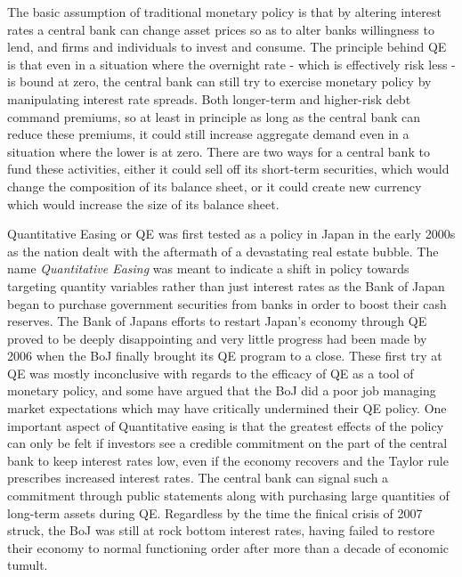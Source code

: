 \documentclass[12pt]{report}
\begin{document}

The basic assumption of traditional monetary policy is that by altering interest rates a central bank can change asset prices so as to alter banks willingness to lend, and firms and individuals to invest and consume.\autocite[51]{fawley2013four}
The principle behind QE is that even in a situation where the overnight rate - which is effectively risk less - is bound at zero, the central bank can still try to exercise monetary policy by manipulating interest rate spreads.\autocite[466]{blinder2010quantitative}
Both longer-term and higher-risk debt command premiums, so at least in principle as long as the central bank can reduce these premiums, it could still increase aggregate demand even in a situation where the lower is at zero.\autocite[466]{blinder2010quantitative}
There are two ways for a central bank to fund these activities, either it could sell off its short-term securities, which would change the composition of its balance sheet, or it could create new currency which would increase the size of its balance sheet.\autocite[467]{blinder2010quantitative}

Quantitative Easing or QE was first tested as a policy in Japan in the early 2000s as the nation dealt with the aftermath of a devastating real estate bubble.\autocite[274]{joyce2012quantitative}
The name \emph{Quantitative Easing} was meant to indicate a shift in policy towards targeting quantity variables rather than just interest rates as the Bank of Japan began to purchase government securities from banks in order to boost their cash reserves.\autocite[274]{joyce2012quantitative}
The Bank of Japans efforts to restart Japan's economy through QE proved to be deeply disappointing and very little progress had been made by 2006 when the BoJ finally brought its QE program to a close.\autocite[55]{fawley2013four}
These first try at QE was mostly inconclusive with regards to the efficacy of QE as a tool of monetary policy, and some have argued that the BoJ did a poor job managing market expectations which may have critically undermined their QE policy.\autocite[55]{fawley2013four}
One important aspect of Quantitative easing is that the greatest effects of the policy can only be felt if investors see a credible commitment on the part of the central bank to keep interest rates low, even if the economy recovers and the Taylor rule prescribes increased interest rates.\autocite[4]{krishnamurthy2011effects}
The central bank can signal such a commitment through public statements along with purchasing large quantities of long-term assets during QE.\autocite[4]{krishnamurthy2011effects}
Regardless by the time the finical crisis of 2007 struck, the BoJ was still at rock bottom interest rates, having failed to restore their economy to normal functioning order after more than a decade of economic tumult.\autocite[56]{fawley2013four}
\end{document}
